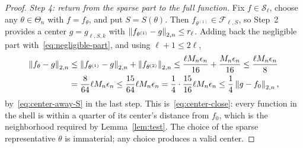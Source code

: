 \begin{proof}
\smallskip\noindent\emph{Step 4: return from the sparse part to the full function.}
Fix $f\in\mathcal S_\ell$, choose any $\theta\in\Theta_n$ with $f=f_\theta$, and put $S=S(\theta)$. Then $f_{\theta^{(1)}}\in\mathcal F_{\ell,S}$, so Step~2 provides a center $g=g_{\ell,S,k}$ with $\left\lVert f_{\theta^{(1)}}-g \right\rVert_{2,n}\leq r_\ell$. Adding back the negligible part with~\eqref{eq:negligible-part}, and using $\ell+1\leq2\ell$,
\begin{align*}
\left\lVert f_\theta-g \right\rVert_{2,n}
&\leq\left\lVert f_{\theta^{(1)}}-g \right\rVert_{2,n}+\left\lVert f_{\theta^{(2)}} \right\rVert_{2,n}
\leq\frac{\ell M_n\epsilon_n}{16}+\frac{M_n\epsilon_n}{16}
\leq\frac{\ell M_n\epsilon_n}{8}\\
&=\frac{8}{64}\ell M_n\epsilon_n
\leq\frac{15}{64}\ell M_n\epsilon_n
=\frac14\cdot\frac{15}{16}\ell M_n\epsilon_n
\leq\frac14\left\lVert g-f_0 \right\rVert_{2,n},
\end{align*}
by~\eqref{eq:center-away-S} in the last step. This is~\eqref{eq:center-close}: every function in the shell is within a quarter of its center's distance from $f_0$, which is the neighborhood required by Lemma~\ref{lem:test}. The choice of the sparse representative $\theta$ is immaterial; any choice produces a valid center.
\end{proof}

